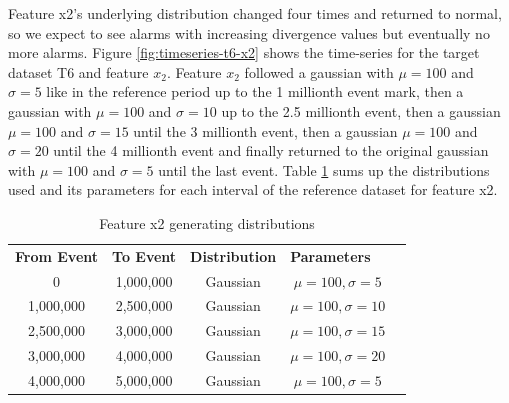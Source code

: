 Feature x2's underlying distribution changed four times and returned to normal, so we expect to see alarms with increasing divergence values but eventually no more alarms. Figure \ref{fig:timeseries-t6-x2} shows the time-series for the target dataset T6 and feature $x_2$. Feature $x_2$ followed a gaussian with $\mu=100$ and $\sigma=5$ like in the reference period up to the 1 millionth event mark, then a gaussian with $\mu=100$ and $\sigma=10$ up to the 2.5 millionth event, then a gaussian $\mu=100$ and $\sigma=15$ until the 3 millionth event, then a gaussian $\mu=100$ and $\sigma=20$ until the 4 millionth event and finally returned to the original gaussian with $\mu=100$ and $\sigma=5$ until the last event. Table \ref{tbl:multi-feat-x2-changes} sums up the distributions used and its parameters for each interval of the reference dataset for feature x2.
\begin{table}[!htb]
    \begin{center}
    \begin{tabular}{|c|c|c|c|l}
    \cline{1-4}
    \textbf{From Event} & \textbf{To Event} & \textbf{Distribution} & \multicolumn{1}{l|}{\textbf{Parameters}} &  \\ \cline{1-4}
    0                   & 1,000,000         & Gaussian              & $\mu=100, \sigma=5$                      &  \\ \cline{1-4}
    1,000,000           & 2,500,000         & Gaussian              & $\mu=100, \sigma=10$                     &  \\ \cline{1-4}
    2,500,000           & 3,000,000         & Gaussian              & $\mu=100, \sigma=15$                     &  \\ \cline{1-4}
    3,000,000           & 4,000,000         & Gaussian              & $\mu=100, \sigma=20$                      &  \\ \cline{1-4}
    4,000,000           & 5,000,000         & Gaussian              & $\mu=100, \sigma=5$                      &  \\ \cline{1-4}
    \end{tabular}
    \end{center}
    \caption{Feature x2 generating distributions}
    \label{tbl:multi-feat-x2-changes}
\end{table}

